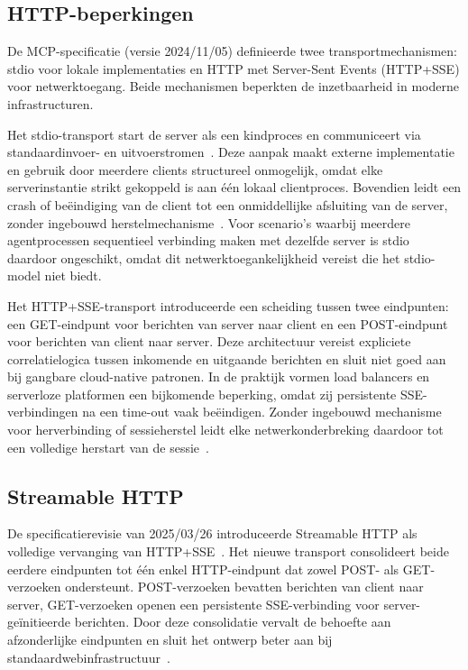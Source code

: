 \subsection{HTTP-beperkingen}\label{subsec:http-limitations}

De MCP-specificatie (versie 2024/11/05) definieerde twee transportmechanismen: stdio voor lokale implementaties en HTTP met Server-Sent Events (HTTP+SSE) voor netwerktoegang. Beide mechanismen beperkten de inzetbaarheid in moderne infrastructuren.

Het stdio-transport start de server als een kindproces en communiceert via standaardinvoer- en uitvoerstromen~\cite{mcpspec2025}. Deze aanpak maakt externe implementatie en gebruik door meerdere clients structureel onmogelijk, omdat elke serverinstantie strikt gekoppeld is aan één lokaal clientproces. Bovendien leidt een crash of beëindiging van de client tot een onmiddellijke afsluiting van de server, zonder ingebouwd herstelmechanisme~\cite{Ray_2025}. Voor scenario's waarbij meerdere agentprocessen sequentieel verbinding maken met dezelfde server is stdio daardoor ongeschikt, omdat dit netwerktoegankelijkheid vereist die het stdio-model niet biedt.

Het HTTP+SSE-transport introduceerde een scheiding tussen twee eindpunten: een GET-eindpunt voor berichten van server naar client en een POST-eindpunt voor berichten van client naar server. Deze architectuur vereist expliciete correlatielogica tussen inkomende en uitgaande berichten en sluit niet goed aan bij gangbare cloud-native patronen. In de praktijk vormen load balancers en serverloze platformen een bijkomende beperking, omdat zij persistente SSE-verbindingen na een time-out vaak beëindigen. Zonder ingebouwd mechanisme voor herverbinding of sessieherstel leidt elke netwerkonderbreking daardoor tot een volledige herstart van de sessie~\cite{Alla2025FastMCP}.

\subsection{Streamable HTTP}\label{subsec:streamable-http}

De specificatierevisie van 2025/03/26 introduceerde Streamable HTTP als volledige vervanging van HTTP+SSE~\cite{mcpspec2025transports}. Het nieuwe transport consolideert beide eerdere eindpunten tot één enkel HTTP-eindpunt dat zowel POST- als GET-verzoeken ondersteunt. POST-verzoeken bevatten berichten van client naar server, GET-verzoeken openen een persistente SSE-verbinding voor server-geïnitieerde berichten. Door deze consolidatie vervalt de behoefte aan afzonderlijke eindpunten en sluit het ontwerp beter aan bij standaardwebinfrastructuur~\cite{mcpspec2025transports}.

